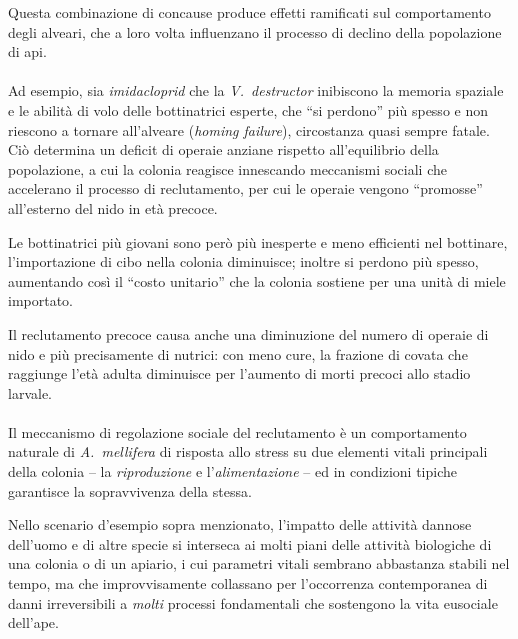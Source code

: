 Questa combinazione di concause produce effetti ramificati sul comportamento degli alveari, che a loro volta influenzano il processo di declino della popolazione di api.

\paragraph{}
Ad esempio, sia \emph{imidacloprid} che la \emph{V.~destructor} inibiscono la memoria spaziale e le abilità di volo delle bottinatrici esperte, che ``si perdono'' più spesso e non riescono a tornare all'alveare (\emph{homing failure}), circostanza quasi sempre fatale. Ciò determina un deficit di operaie anziane rispetto all'equilibrio della popolazione, a cui la colonia reagisce innescando meccanismi sociali che accelerano il processo di reclutamento, per cui le operaie vengono ``promosse'' all'esterno del nido in età precoce.

Le bottinatrici più giovani sono però più inesperte e meno efficienti nel bottinare, l'importazione di cibo nella colonia diminuisce; inoltre si perdono più spesso, aumentando così il ``costo unitario'' che la colonia sostiene per una unità di miele importato.

Il reclutamento precoce causa anche una diminuzione del numero di operaie di nido e più precisamente di nutrici:
con meno cure, la frazione di covata che raggiunge l'età adulta diminuisce per l'aumento di morti precoci allo stadio larvale.

\paragraph{}
\label{par:socialRecr}
Il meccanismo di regolazione sociale del reclutamento è un comportamento naturale di \emph{A.~mellifera}
di risposta allo stress su due elementi vitali principali della colonia -- la \emph{riproduzione} e l'\emph{alimentazione} -- ed in condizioni tipiche garantisce la sopravvivenza della stessa.

Nello scenario d'esempio sopra menzionato, l'impatto delle attività dannose dell'uomo e di altre specie si interseca ai molti piani delle attività biologiche di una colonia o di un apiario, i cui parametri vitali sembrano abbastanza stabili nel tempo, ma che improvvisamente collassano per l'occorrenza contemporanea di danni irreversibili a \emph{molti} processi fondamentali che sostengono la vita eusociale dell'ape.

